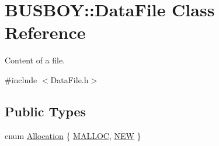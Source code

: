 \hypertarget{classBUSBOY_1_1DataFile}{
\section{BUSBOY::DataFile Class Reference}
\label{classBUSBOY_1_1DataFile}
}


Content of a file.  


{\ttfamily \#include $<$DataFile.h$>$}\subsection*{Public Types}
\begin{DoxyCompactItemize}
\item 
enum \hyperlink{classBUSBOY_1_1DataFile_aff6de50b1c1e19698f0b4fdf2c62e02b}{Allocation} \{ \hyperlink{classBUSBOY_1_1DataFile_aff6de50b1c1e19698f0b4fdf2c62e02baeac067bf27342c26055791a0abd2544d}{MALLOC}, 
\hyperlink{classBUSBOY_1_1DataFile_aff6de50b1c1e19698f0b4fdf2c62e02ba3f1fd046f6e2b873b0026fc7d01b2dda}{NEW}
 \}
\end{DoxyCompactItemize}
